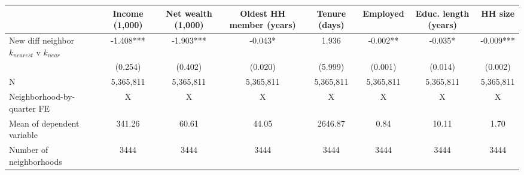 \begin{tabular}[t]{lccccccc}
\toprule
  & Income (1,000) & Net wealth (1,000) & Oldest HH member (years) & Tenure (days) & Employed & Educ. length (years) & HH size\\
\midrule
New diff neighbor $k_{nearest}$ v $k_{near}$ & -1.408*** & -1.903*** & -0.043* & 1.936 & -0.002** & -0.035* & -0.009***\\
 & (0.254) & (0.402) & (0.020) & (5.999) & (0.001) & (0.014) & (0.002)\\
\midrule
N & 5,365,811 & 5,365,811 & 5,365,811 & 5,365,811 & 5,365,811 & 5,365,811 & 5,365,811\\
Neighborhood-by-quarter FE & X & X & X & X & X & X & X\\
Mean of dependent variable & 341.26 & 60.61 & 44.05 & 2646.87 & 0.84 & 10.11 & 1.70\\
Number of neighborhoods & 3444 & 3444 & 3444 & 3444 & 3444 & 3444 & 3444\\
\bottomrule
\end{tabular}